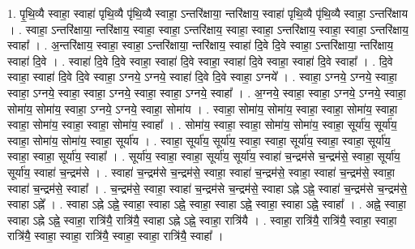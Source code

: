 \documentclass[17pt]{extarticle}
\begin{document}
1. पृ॒थि॒व्यै स्वाहा॒ स्वाहा॑ पृथि॒व्यै पृ॑थि॒व्यै स्वाहा॒ ऽन्तरि॑क्षाया॒ न्तरि॑क्षाय॒ स्वाहा॑ पृथि॒व्यै पृ॑थि॒व्यै स्वाहा॒ ऽन्तरि॑क्षाय । . स्वाहा॒ ऽन्तरि॑क्षाया॒ न्तरि॑क्षाय॒ स्वाहा॒ स्वाहा॒ ऽन्तरि॑क्षाय॒ स्वाहा॒ स्वाहा॒ ऽन्तरि॑क्षाय॒ स्वाहा॒ स्वाहा॒ ऽन्तरि॑क्षाय॒ स्वाहा᳚ । . अ॒न्तरि॑क्षाय॒ स्वाहा॒ स्वाहा॒ ऽन्तरि॑क्षाया॒ न्तरि॑क्षाय॒ स्वाहा॑ दि॒वे दि॒वे स्वाहा॒ ऽन्तरि॑क्षाया॒ न्तरि॑क्षाय॒ स्वाहा॑ दि॒वे । . स्वाहा॑ दि॒वे दि॒वे स्वाहा॒ स्वाहा॑ दि॒वे स्वाहा॒ स्वाहा॑ दि॒वे स्वाहा॒ स्वाहा॑ दि॒वे स्वाहा᳚ । . दि॒वे स्वाहा॒ स्वाहा॑ दि॒वे दि॒वे स्वाहा॒ ऽग्नये॒ ऽग्नये॒ स्वाहा॑ दि॒वे दि॒वे स्वाहा॒ ऽग्नये᳚ । . स्वाहा॒ ऽग्नये॒ ऽग्नये॒ स्वाहा॒ स्वाहा॒ ऽग्नये॒ स्वाहा॒ स्वाहा॒ ऽग्नये॒ स्वाहा॒ स्वाहा॒ ऽग्नये॒ स्वाहा᳚ । . अ॒ग्नये॒ स्वाहा॒ स्वाहा॒ ऽग्नये॒ ऽग्नये॒ स्वाहा॒ सोमा॑य॒ सोमा॑य॒ स्वाहा॒ ऽग्नये॒ ऽग्नये॒ स्वाहा॒ सोमा॑य । . स्वाहा॒ सोमा॑य॒ सोमा॑य॒ स्वाहा॒ स्वाहा॒ सोमा॑य॒ स्वाहा॒ स्वाहा॒ सोमा॑य॒ स्वाहा॒ स्वाहा॒ सोमा॑य॒ स्वाहा᳚ । . सोमा॑य॒ स्वाहा॒ स्वाहा॒ सोमा॑य॒ सोमा॑य॒ स्वाहा॒ सूर्या॑य॒ सूर्या॑य॒ स्वाहा॒ सोमा॑य॒ सोमा॑य॒ स्वाहा॒ सूर्या॑य । . स्वाहा॒ सूर्या॑य॒ सूर्या॑य॒ स्वाहा॒ स्वाहा॒ सूर्या॑य॒ स्वाहा॒ स्वाहा॒ सूर्या॑य॒ स्वाहा॒ स्वाहा॒ सूर्या॑य॒ स्वाहा᳚ । . सूर्या॑य॒ स्वाहा॒ स्वाहा॒ सूर्या॑य॒ सूर्या॑य॒ स्वाहा॑ च॒न्द्रम॑से च॒न्द्रम॑से॒ स्वाहा॒ सूर्या॑य॒ सूर्या॑य॒ स्वाहा॑ च॒न्द्रम॑से । . स्वाहा॑ च॒न्द्रम॑से च॒न्द्रम॑से॒ स्वाहा॒ स्वाहा॑ च॒न्द्रम॑से॒ स्वाहा॒ स्वाहा॑ च॒न्द्रम॑से॒ स्वाहा॒ स्वाहा॑ च॒न्द्रम॑से॒ स्वाहा᳚ । . च॒न्द्रम॑से॒ स्वाहा॒ स्वाहा॑ च॒न्द्रम॑से च॒न्द्रम॑से॒ स्वाहा ऽह्ने ऽह्ने॒ स्वाहा॑ च॒न्द्रम॑से च॒न्द्रम॑से॒ स्वाहा ऽह्ने᳚ । . स्वाहा ऽह्ने ऽह्ने॒ स्वाहा॒ स्वाहा ऽह्ने॒ स्वाहा॒ स्वाहा ऽह्ने॒ स्वाहा॒ स्वाहा ऽह्ने॒ स्वाहा᳚ । . अह्ने॒ स्वाहा॒ स्वाहा ऽह्ने ऽह्ने॒ स्वाहा॒ रात्रि॑यै॒ रात्रि॑यै॒ स्वाहा ऽह्ने ऽह्ने॒ स्वाहा॒ रात्रि॑यै । . स्वाहा॒ रात्रि॑यै॒ रात्रि॑यै॒ स्वाहा॒ स्वाहा॒ रात्रि॑यै॒ स्वाहा॒ स्वाहा॒ रात्रि॑यै॒ स्वाहा॒ स्वाहा॒ रात्रि॑यै॒ स्वाहा᳚ । \newline
\end{document}
